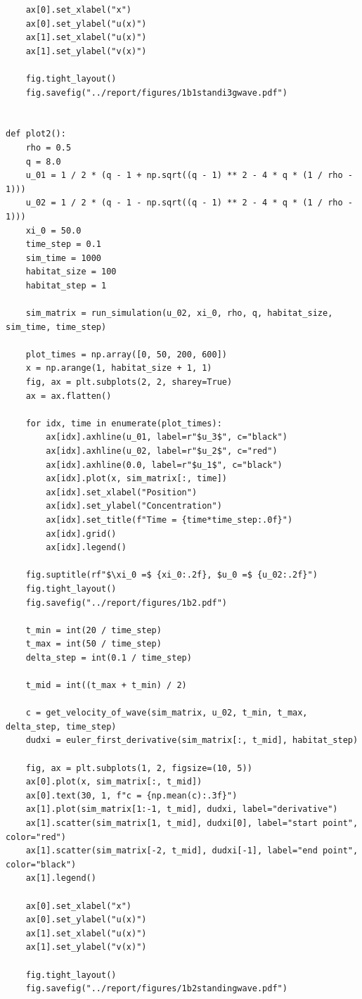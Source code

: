 \documentclass[15pt]{article}
\begin{document}
\begin{verbatim}
    ax[0].set_xlabel("x")
    ax[0].set_ylabel("u(x)")
    ax[1].set_xlabel("u(x)")
    ax[1].set_ylabel("v(x)")

    fig.tight_layout()
    fig.savefig("../report/figures/1b1standi3gwave.pdf")


def plot2():
    rho = 0.5
    q = 8.0
    u_01 = 1 / 2 * (q - 1 + np.sqrt((q - 1) ** 2 - 4 * q * (1 / rho - 1)))
    u_02 = 1 / 2 * (q - 1 - np.sqrt((q - 1) ** 2 - 4 * q * (1 / rho - 1)))
    xi_0 = 50.0
    time_step = 0.1
    sim_time = 1000
    habitat_size = 100
    habitat_step = 1

    sim_matrix = run_simulation(u_02, xi_0, rho, q, habitat_size, sim_time, time_step)

    plot_times = np.array([0, 50, 200, 600])
    x = np.arange(1, habitat_size + 1, 1)
    fig, ax = plt.subplots(2, 2, sharey=True)
    ax = ax.flatten()

    for idx, time in enumerate(plot_times):
        ax[idx].axhline(u_01, label=r"$u_3$", c="black")
        ax[idx].axhline(u_02, label=r"$u_2$", c="red")
        ax[idx].axhline(0.0, label=r"$u_1$", c="black")
        ax[idx].plot(x, sim_matrix[:, time])
        ax[idx].set_xlabel("Position")
        ax[idx].set_ylabel("Concentration")
        ax[idx].set_title(f"Time = {time*time_step:.0f}")
        ax[idx].grid()
        ax[idx].legend()

    fig.suptitle(rf"$\xi_0 =$ {xi_0:.2f}, $u_0 =$ {u_02:.2f}")
    fig.tight_layout()
    fig.savefig("../report/figures/1b2.pdf")

    t_min = int(20 / time_step)
    t_max = int(50 / time_step)
    delta_step = int(0.1 / time_step)

    t_mid = int((t_max + t_min) / 2)

    c = get_velocity_of_wave(sim_matrix, u_02, t_min, t_max, delta_step, time_step)
    dudxi = euler_first_derivative(sim_matrix[:, t_mid], habitat_step)

    fig, ax = plt.subplots(1, 2, figsize=(10, 5))
    ax[0].plot(x, sim_matrix[:, t_mid])
    ax[0].text(30, 1, f"c = {np.mean(c):.3f}")
    ax[1].plot(sim_matrix[1:-1, t_mid], dudxi, label="derivative")
    ax[1].scatter(sim_matrix[1, t_mid], dudxi[0], label="start point", color="red")
    ax[1].scatter(sim_matrix[-2, t_mid], dudxi[-1], label="end point", color="black")
    ax[1].legend()

    ax[0].set_xlabel("x")
    ax[0].set_ylabel("u(x)")
    ax[1].set_xlabel("u(x)")
    ax[1].set_ylabel("v(x)")

    fig.tight_layout()
    fig.savefig("../report/figures/1b2standingwave.pdf")



\end{verbatim}
\end{document}
